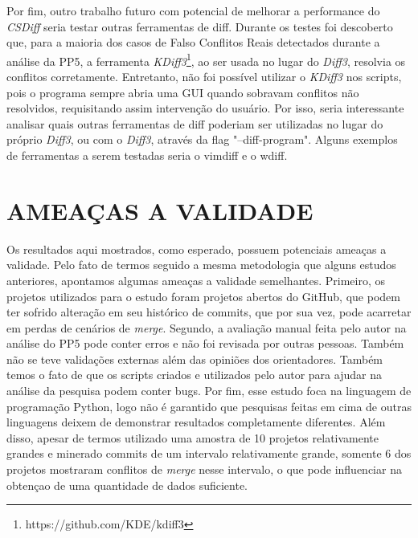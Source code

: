 Por fim, outro trabalho futuro com potencial de melhorar a performance do \emph{CSDiff} seria testar outras ferramentas de diff. Durante
os testes foi descoberto que, para a maioria dos casos de Falso Conflitos Reais detectados durante a análise da PP5,
a ferramenta \emph{KDiff3}\footnote{https://github.com/KDE/kdiff3},
ao ser usada no lugar do \emph{Diff3}, resolvia os conflitos corretamente. Entretanto, não foi possível utilizar o \emph{KDiff3} nos scripts,
pois o programa sempre abria uma GUI quando sobravam conflitos não resolvidos, requisitando assim intervenção do usuário. Por isso,
seria interessante analisar quais outras ferramentas de diff poderiam ser utilizadas no lugar do próprio \emph{Diff3}, ou com o \emph{Diff3},
através da flag "--diff-program". Alguns exemplos de ferramentas a serem testadas seria o vimdiff e o wdiff.

\section{AMEAÇAS A VALIDADE}
Os resultados aqui mostrados, como esperado, possuem potenciais ameaças a validade. Pelo fato de termos seguido
a mesma metodologia que alguns estudos anteriores, apontamos algumas ameaças a validade semelhantes.
Primeiro, os projetos utilizados para
o estudo foram projetos abertos do GitHub, que podem ter sofrido
alteração em seu histórico de commits, que por sua vez, pode
acarretar em perdas de cenários de \emph{merge}.
Segundo, a avaliação manual feita pelo autor na análise do PP5 pode conter erros e não foi revisada por outras pessoas.
Também não se teve validações externas além das opiniões dos orientadores.
Também temos o fato de que os scripts criados e utilizados pelo autor para ajudar na análise da pesquisa podem conter bugs.
Por fim, esse estudo foca na linguagem de programação Python, logo não é garantido que pesquisas feitas em cima de outras
linguagens deixem de demonstrar resultados completamente diferentes.
Além disso, apesar de termos utilizado uma amostra de 10 projetos relativamente grandes e minerado commits de um intervalo
relativamente grande, somente 6 dos projetos mostraram conflitos de \emph{merge} nesse intervalo, o que pode influenciar na obtençao de
uma quantidade de dados suficiente.



